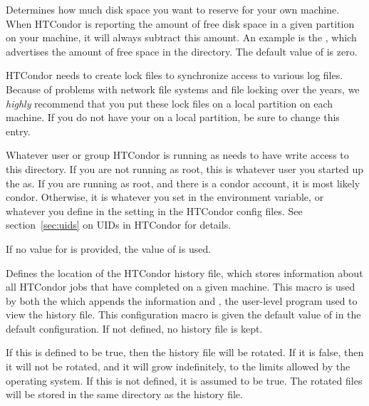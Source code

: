 \begin{description}
\label{param:ReservedDisk}
\item[\Macro{RESERVED\_DISK}]
  Determines how much disk space you want to reserve for your own machine.
  When HTCondor is reporting the amount of free disk space in a given
  partition on your machine, it will always subtract this amount.  An
  example is the , which advertises the amount of free
  space in the  directory.  The default value of
   is zero.
  
\label{param:Lock}
\item[\Macro{LOCK}]
  HTCondor needs to create
  lock files to synchronize access to various log files.  Because of
  problems with network file systems and file locking over
  the years, we \emph{highly} recommend that you put these lock
  files on a local partition on each machine.  If you do not have your
   on a local partition, be sure to change this
  entry.

  Whatever user or group HTCondor is running as needs to have
  write access to this directory.  If you are not running as root, this
  is whatever user you started up the  as.  If you are
  running as root, and there is a condor account, it is most
  likely condor.
  Otherwise, it is whatever you set in the 
  environment variable, or whatever you define in the
   setting in the HTCondor config files.
  See section~\ref{sec:uids} on UIDs in HTCondor for details.

  If no value for  is provided, the value of 
  is used.


\label{param:History}
\item[\Macro{HISTORY}]
  Defines the
  location of the HTCondor history file, which stores information about
  all HTCondor jobs that have completed on a given machine.  This macro
  is used by both the  which appends the information
  and , the user-level program used to view
  the history file.
  This configuration macro is given the default value of
   in the default configuration.
  If not defined,
  no history file is kept.

\label{param:EnableHistoryRotation} 
\item[\Macro{ENABLE\_HISTORY\_ROTATION}]
  If this is defined to be true, then the
  history file will be rotated. If it is false, then it will not be
  rotated, and it will grow indefinitely, to the limits allowed by the
  operating system. If this is not defined, it is assumed to be
  true. The rotated files will be stored in the same directory as the
  history file. 


\end{description}
